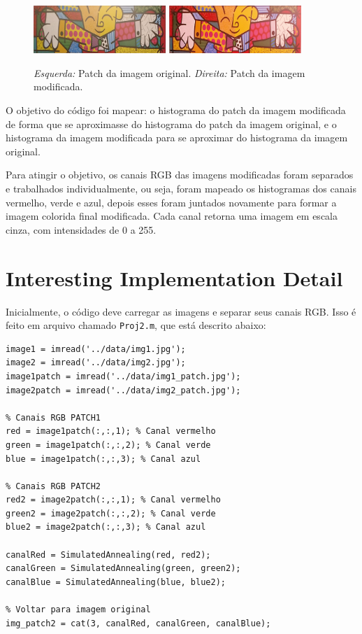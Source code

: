 \begin{figure}[h]
    \centering
    \includegraphics[width=5cm]{../data/img1_patch.jpg}
    \includegraphics[width=5cm]{../data/img2_patch.jpg}
    \caption{\emph{Esquerda:} Patch da imagem original. \emph{Direita:} Patch da imagem modificada.}
    \label{fig:imagensPatch}
\end{figure}

O objetivo do código foi mapear: o histograma do patch da imagem modificada de forma que se aproximasse do histograma do patch da imagem original, e o histograma da imagem modificada  para se aproximar do histograma da imagem original.

Para atingir o objetivo, os canais RGB das imagens modificadas foram separados e trabalhados individualmente, ou seja, foram mapeado os histogramas dos canais vermelho, verde e azul, depois esses foram juntados novamente para formar a imagem colorida final modificada. Cada canal retorna uma imagem em escala cinza, com intensidades de 0 a 255.



\section*{Interesting Implementation Detail}
Inicialmente, o código deve carregar as imagens e separar seus canais RGB. Isso é feito em arquivo chamado \texttt{Proj2.m}, que está descrito abaixo:

\begin{lstlisting}[style=Matlab-editor]
image1 = imread('../data/img1.jpg');
image2 = imread('../data/img2.jpg');
image1patch = imread('../data/img1_patch.jpg');
image2patch = imread('../data/img2_patch.jpg');

% Canais RGB PATCH1
red = image1patch(:,:,1); % Canal vermelho
green = image1patch(:,:,2); % Canal verde
blue = image1patch(:,:,3); % Canal azul

% Canais RGB PATCH2
red2 = image2patch(:,:,1); % Canal vermelho
green2 = image2patch(:,:,2); % Canal verde
blue2 = image2patch(:,:,3); % Canal azul

canalRed = SimulatedAnnealing(red, red2);
canalGreen = SimulatedAnnealing(green, green2);
canalBlue = SimulatedAnnealing(blue, blue2);

% Voltar para imagem original
img_patch2 = cat(3, canalRed, canalGreen, canalBlue);

\end{lstlisting}

